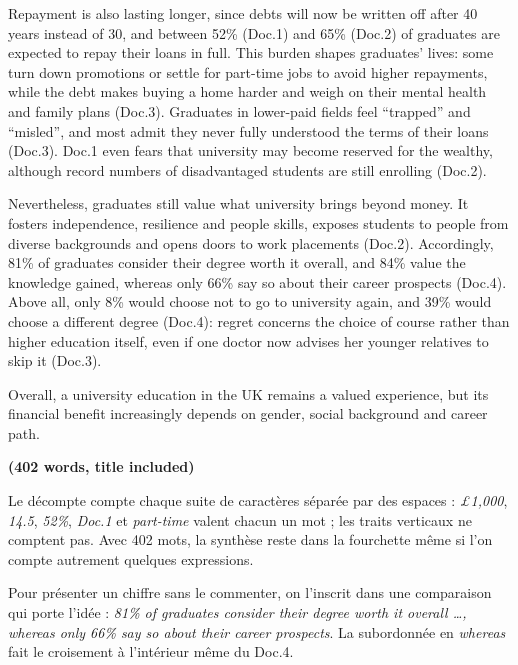 \documentclass[11pt,a4paper]{article}
\begin{document}
Repayment is also lasting longer, since debts will now be written off after 40 years \textbar{} instead of 30, and between 52\% (Doc.1) and 65\% (Doc.2) of graduates are expected to repay their loans in full. \textbar{} This burden shapes graduates' lives: some turn down promotions or settle for part-time jobs to avoid higher repayments, while the \textbar{} debt makes buying a home harder and weigh on their mental health and family plans (Doc.3). Graduates in lower-paid fields \textbar{} feel ``trapped'' and ``misled'', and most admit they never fully understood the terms of their loans (Doc.3). Doc.1 even fears \textbar{} that university may become reserved for the wealthy, although record numbers of disadvantaged students are still enrolling (Doc.2).

Nevertheless, graduates \textbar{} still value what university brings beyond money. It fosters independence, resilience and people skills, exposes students to people from diverse \textbar{} backgrounds and opens doors to work placements (Doc.2). Accordingly, 81\% of graduates consider their degree worth it overall, and 84\% \textbar{} value the knowledge gained, whereas only 66\% say so about their career prospects (Doc.4). Above all, only 8\% would choose \textbar{} not to go to university again, and 39\% would choose a different degree (Doc.4): regret concerns the choice of course \textbar{} rather than higher education itself, even if one doctor now advises her younger relatives to skip it (Doc.3).

Overall, a \textbar{} university education in the UK remains a valued experience, but its financial benefit increasingly depends on gender, social background and \textbar{} career path.

\textbf{(402 words, title included)}

Le décompte compte chaque suite de caractères séparée par des espaces : \emph{£1,000}, \emph{14.5}, \emph{52\%}, \emph{Doc.1} et \emph{part-time} valent chacun un mot ; les traits verticaux ne comptent pas. Avec 402 mots, la synthèse reste dans la fourchette même si l'on compte autrement quelques expressions.

\begin{methode}

Pour présenter un chiffre sans le commenter, on l'inscrit dans une comparaison qui porte l'idée : \emph{81\% of graduates consider their degree worth it overall \ldots, whereas only 66\% say so about their career prospects}. La subordonnée en \emph{whereas} fait le croisement à l'intérieur même du Doc.4.

\end{methode}
\end{document}
